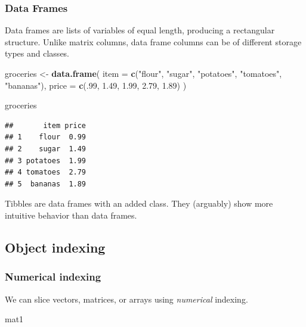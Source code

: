 \documentclass[
  11pt,
]{article}
\newenvironment{Shaded}{\begin{snugshade}}{\end{snugshade}}
\newcommand{\AttributeTok}[1]{\textcolor[rgb]{0.13,0.29,0.53}{#1}}
\newcommand{\DecValTok}[1]{\textcolor[rgb]{0.00,0.00,0.81}{#1}}
\newcommand{\FloatTok}[1]{\textcolor[rgb]{0.00,0.00,0.81}{#1}}
\newcommand{\FunctionTok}[1]{\textcolor[rgb]{0.13,0.29,0.53}{\textbf{#1}}}
\newcommand{\NormalTok}[1]{#1}
\newcommand{\OtherTok}[1]{\textcolor[rgb]{0.56,0.35,0.01}{#1}}
\newcommand{\StringTok}[1]{\textcolor[rgb]{0.31,0.60,0.02}{#1}}
\begin{document}
\hypertarget{data-frames}{%
\subsubsection{Data Frames}\label{data-frames}}

Data frames are lists of variables of equal length, producing a rectangular structure. Unlike matrix columns, data frame columns can be of different storage types and classes.

\begin{Shaded}
\begin{Highlighting}[]
\NormalTok{groceries }\OtherTok{\textless{}{-}} \FunctionTok{data.frame}\NormalTok{(}
  \AttributeTok{item =} \FunctionTok{c}\NormalTok{(}\StringTok{"flour"}\NormalTok{, }\StringTok{"sugar"}\NormalTok{, }\StringTok{"potatoes"}\NormalTok{, }\StringTok{"tomatoes"}\NormalTok{, }\StringTok{"bananas"}\NormalTok{),}
  \AttributeTok{price =} \FunctionTok{c}\NormalTok{(.}\DecValTok{99}\NormalTok{, }\FloatTok{1.49}\NormalTok{, }\FloatTok{1.99}\NormalTok{, }\FloatTok{2.79}\NormalTok{, }\FloatTok{1.89}\NormalTok{)}
\NormalTok{)}

\NormalTok{groceries}
\end{Highlighting}
\end{Shaded}

\begin{verbatim}
##       item price
## 1    flour  0.99
## 2    sugar  1.49
## 3 potatoes  1.99
## 4 tomatoes  2.79
## 5  bananas  1.89
\end{verbatim}

Tibbles are data frames with an added class. They (arguably) show more intuitive behavior than data frames.

\hypertarget{object-indexing}{%
\subsection{Object indexing}\label{object-indexing}}

\hypertarget{numerical-indexing}{%
\subsubsection{Numerical indexing}\label{numerical-indexing}}

We can slice vectors, matrices, or arrays using \emph{numerical} indexing.

\begin{Shaded}
\begin{Highlighting}[]
\NormalTok{mat1}
\end{Highlighting}
\end{Shaded}
\end{document}
